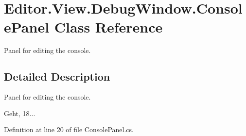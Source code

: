 \section{Editor.\-View.\-Debug\-Window.\-Console\-Panel Class Reference}
\label{class_editor_1_1_view_1_1_debug_window_1_1_console_panel}


Panel for editing the console.  




\subsection{Detailed Description}
Panel for editing the console. 

Geht, 18... 

Definition at line 20 of file Console\-Panel.\-cs.

